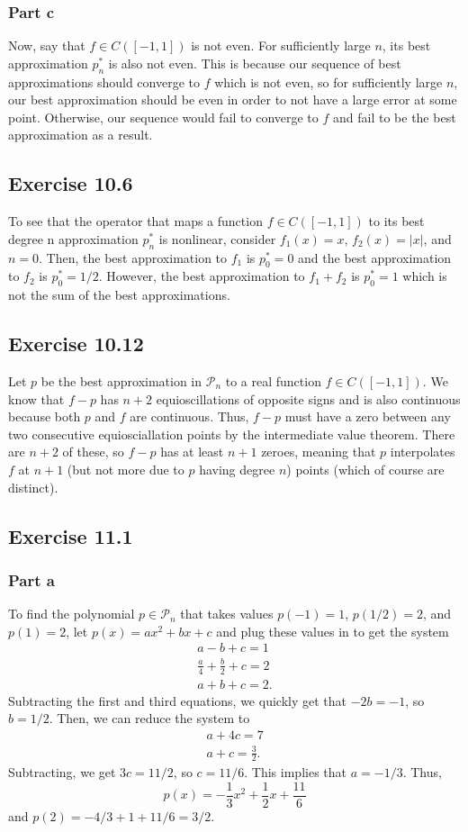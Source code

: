 \documentclass{article}
\begin{document}
\subsubsection{Part c}
Now, say that $f\in C([-1, 1])$ is not even. For sufficiently large $n$, its best approximation $p_n^*$ is also not even. This is because our sequence of best approximations should converge to $f$ which is not even, so for sufficiently large $n$, our best approximation should be even in order to not have a large error at some point. Otherwise, our sequence would fail to converge to $f$ and fail to be the best approximation as a result.   

\subsection{Exercise 10.6}
To see that the operator that maps a function $f\in C([-1, 1])$ to its best degree n
approximation $p_n^*$ is nonlinear, consider $f_1(x)=x$, $f_2(x)=|x|$, and $n=0$. Then, the best approximation to $f_1$ is $p_0^*=0$ and the best approximation to $f_2$ is $p_0^*=1/2$. However,  the best approximation to $f_1+f_2$ is $p_0^*=1$ which is not the sum of the best approximations.

\subsection{Exercise 10.12}
Let $p$ be the best approximation in $\mathcal{P}_n$ to a real function $f\in C([-1, 1])$. We know that $f-p$ has $n+2$ equioscillations of opposite signs and is also continuous because both $p$ and $f$ are continuous. Thus, $f-p$ must have a zero between any two consecutive equiosciallation points by the intermediate value theorem. There are $n+2$ of these, so $f-p$ has at least $n+1$ zeroes, meaning that $p$ interpolates $f$ at $n+1$ (but not more due to $p$ having degree $n$) points (which of course are distinct). 

\subsection{Exercise 11.1}
\subsubsection{Part a}
To find the polynomial $p\in\mathcal{P}_n$ that takes values $p(-1) = 1$, $p(1/2) = 2$, and $p(1) = 2$, let $p(x)=ax^2+bx+c$ and plug these values in to get the system
\begin{align*}
a-b+c=1\\
\frac{a}{4}+\frac{b}{2}+c=2\\
a+b+c=2.
\end{align*}
Subtracting the first and third equations, we quickly get that $-2b=-1$, so $b=1/2$. Then, we can reduce the system to
\begin{align*}
a+4c=7\\
a+c=\frac{3}{2}.
\end{align*}
Subtracting, we get $3c=11/2$, so $c=11/6$. This implies that $a=-1/3$. Thus,
\[
p(x)=-\frac{1}{3}x^2+\frac{1}{2}x+\frac{11}{6}
\]
and $p(2)=-4/3+1+11/6=3/2$.
\end{document}
